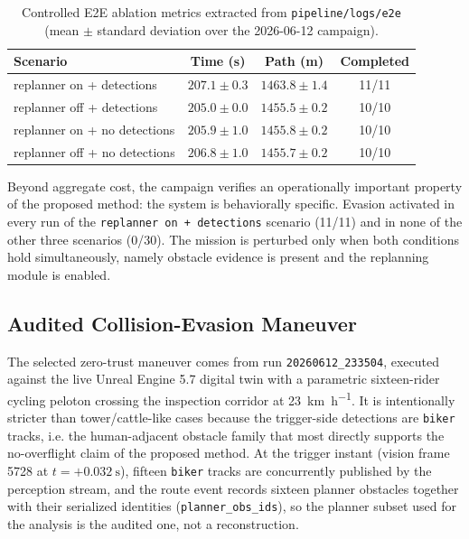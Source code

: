 \documentclass[a4paper,11pt]{article}
\begin{document}
\begin{table}[t]
    \centering
    \caption{Controlled E2E ablation metrics extracted from \texttt{pipeline/logs/e2e} (mean $\pm$ standard deviation over the 2026-06-12 campaign).}
    \label{tab:e2e}
    \small
    \begin{tabularx}{\linewidth}{@{}Y c c c@{}}
        \toprule
        \textbf{Scenario} & {\textbf{Time (s)}} & {\textbf{Path (m)}} & \textbf{Completed} \\
        \midrule
        replanner on + detections & $207.1 \pm 0.3$ & $1463.8 \pm 1.4$ & 11/11 \\
        replanner off + detections & $205.0 \pm 0.0$ & $1455.5 \pm 0.2$ & 10/10 \\
        replanner on + no detections & $205.9 \pm 1.0$ & $1455.8 \pm 0.2$ & 10/10 \\
        replanner off + no detections & $206.8 \pm 1.0$ & $1455.7 \pm 0.2$ & 10/10 \\
        \bottomrule
    \end{tabularx}
\end{table}

Beyond aggregate cost, the campaign verifies an operationally important property of the proposed method: the system is behaviorally specific. Evasion activated in every run of the \texttt{replanner on + detections} scenario (11/11) and in none of the other three scenarios (0/30). The mission is perturbed only when both conditions hold simultaneously, namely obstacle evidence is present and the replanning module is enabled.

\subsection{Audited Collision-Evasion Maneuver}

The selected zero-trust maneuver comes from run \texttt{20260612\_233504}, executed against the live Unreal Engine 5.7 digital twin with a parametric sixteen-rider cycling peloton crossing the inspection corridor at \SI{23}{\kilo\meter\per\hour}. It is intentionally stricter than tower/cattle-like cases because the trigger-side detections are \texttt{biker} tracks, i.e. the human-adjacent obstacle family that most directly supports the no-overflight claim of the proposed method. At the trigger instant (vision frame 5728 at \(t=+\SI{0.032}{\second}\)), fifteen \texttt{biker} tracks are concurrently published by the perception stream, and the route event records sixteen planner obstacles together with their serialized identities (\texttt{planner\_obs\_ids}), so the planner subset used for the analysis is the audited one, not a reconstruction.
\end{document}
